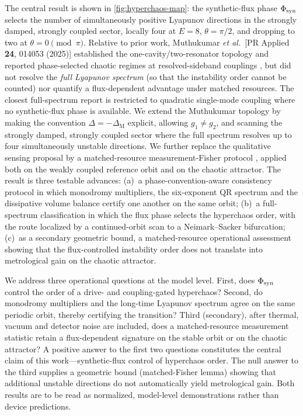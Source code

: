 \documentclass[Phys]{SciPost}
\begin{document}
The central result is shown in \cref{fig:hyperchaos-map}: the synthetic-flux phase $\Phi_{\rm syn}$ selects the number of simultaneously positive Lyapunov directions in the strongly damped, strongly coupled sector, locally four at $E=\num{8}$, $\theta=\pi/2$, and dropping to two at $\theta=0\pmod{\pi}$. Relative to prior work, Muthukumar \emph{et al.}~[PR Applied \textbf{24}, 014053 (2025)] established the one-cavity/two-resonator topology and reported phase-selected chaotic regimes at resolved-sideband couplings \cite{mondal2024doi,Xu2025}, but did not resolve the \emph{full Lyapunov spectrum} (so that the instability order cannot be counted) nor quantify a flux-dependent advantage under matched resources. The closest full-spectrum report \cite{HalefShomroni2025} is restricted to quadratic single-mode coupling where no synthetic-flux phase is available. We extend the Muthukumar topology by making the convention $\Delta=-\Delta_{\mathrm M}$ explicit, allowing $g_1\neq g_2$, and scanning the strongly damped, strongly coupled sector where the full spectrum resolves up to four simultaneously unstable directions. We further replace the qualitative sensing proposal by a matched-resource measurement-Fisher protocol \cite{braunstein1994,purdy2017,teufel2011,gavartin2012,li2021a}, applied both on the weakly coupled reference orbit and on the chaotic attractor. The result is three testable advances: (a)~a phase-convention-aware consistency protocol in which monodromy multipliers, the six-exponent QR spectrum \cite{benettin1980,wolf1985,eckmann1985} and the dissipative volume balance certify one another on the same orbit; (b)~a full-spectrum classification in which the flux phase \cite{rossler1979} selects the hyperchaos order, with the route localized by a continued-orbit scan \cite{kuznetsov2004,guckenheimer1983,strogatz2015} to a Neimark--Sacker bifurcation; (c)~as a secondary geometric bound, a matched-resource operational assessment showing that the flux-controlled instability order does not translate into metrological gain on the chaotic attractor.

We address three operational questions at the model level. First, does $\Phi_{\rm syn}$ control the order of a drive- and coupling-gated hyperchaos? Second, do monodromy multipliers and the long-time Lyapunov spectrum agree on the same periodic orbit, thereby certifying the transition? Third (secondary), after thermal, vacuum and detector noise are included, does a matched-resource measurement statistic retain a flux-dependent signature on the stable orbit or on the chaotic attractor? A positive answer to the first two questions constitutes the central claim of this work---synthetic-flux control of hyperchaos order. The null answer to the third supplies a geometric bound (matched-Fisher lemma) showing that additional unstable directions do not automatically yield metrological gain. Both results are to be read as normalized, model-level demonstrations rather than device predictions.
\end{document}
